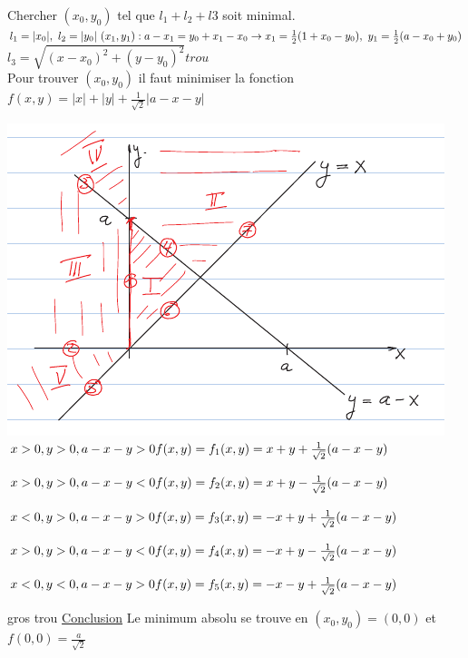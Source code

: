\documentclass[12pt,a4paper]{article}
\begin{document}
\begin{enumerate}
			Chercher $(x_0,y_0)$ tel que $l_1 + l_2 + l3$ soit minimal.\\
			$l_1 = |x_0|,\ l_2 = |y_0|\ (x_1,y_1) : a-x_1 = y_0 + x_1 - x_0 \\
			\to x_1 = \frac{1}{2}(1+x_0 -y_0),\ y_1 = \frac{1}{2}(a-x_0+y_0)$\\
			$l_3 = \sqrt{(x-x_0)^2 + (y-y_0)^2} {trou}$\\
			Pour trouver $(x_0,y_0)$ il faut minimiser la fonction $f(x,y) = |x| + |y| + \frac{1}{\sqrt{2}}|a-x-y|$\\
			\begin{multicols}{2}			
			\includegraphics[scale=0.5]{images/ftw}
			 $x > 0, y > 0, a-x-y > 0\\
			f(x,y) = f_1(x,y) = x+y+\frac{1}{\sqrt{2}}(a-x-y)$
			
			 $x>0,y>0,a-x-y < 0\\
			f(x,y) = f_2(x,y) = x+y-\frac{1}{\sqrt{2}}(a-x-y)$
			\columnbreak			
			
			 $x<0,y>0,a-x-y > 0\\
			f(x,y) = f_3(x,y) = -x+y+\frac{1}{\sqrt{2}}(a-x-y)$
			
			 $x>0,y>0,a-x-y < 0\\
			f(x,y) = f_4(x,y) = -x+y-\frac{1}{\sqrt{2}}(a-x-y)$
			
			 $x<0,y<0,a-x-y > 0\\
			f(x,y) = f_5(x,y) = -x-y+\frac{1}{\sqrt{2}}(a-x-y)$
			\end{multicols}
			{gros trou}
			\uline{Conclusion} Le minimum absolu se trouve en $(x_0,y_0) = (0,0)$ et $f(0,0) = \frac{a}{\sqrt{2}}$
\end{enumerate}
\end{document}
